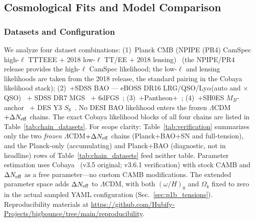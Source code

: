 \documentclass[aps,prd,twocolumn,superscriptaddress,showpacs,preprintnumbers,nofootinbib,longbibliography,floatfix]{revtex4-2}
\newcommand{\Neff}{N_{\rm eff}}
\begin{document}


\subsection{Cosmological Fits and Model Comparison}\label{sec:p1b_cosmo_fits}

\subsubsection{Datasets and Configuration}\label{sec:p1b_fullcomp}

We analyze four dataset combinations: (1)~Planck CMB (NPIPE (PR4) CamSpec high-$\ell$ TTTEEE + 2018 low-$\ell$ TT/EE + 2018 lensing)~\cite{Planck2018params}
(the NPIPE/PR4 release provides the high-$\ell$ CamSpec likelihood; the
low-$\ell$ and lensing likelihoods are taken from the 2018 release, the
standard pairing in the Cobaya likelihood stack);
(2)~+SDSS BAO --- eBOSS DR16 LRG/QSO/Ly$\alpha$(auto and
$\times$QSO)~\cite{eBOSS2021} + SDSS DR7 MGS~\cite{Ross2015MGS} +
6dFGS~\cite{Beutler20116dF}; (3)~+Pantheon+~\cite{Brout2022PantheonPlus}; (4)~+SH0ES
$M_B$-anchor~\cite{Riess2022} + DES Y3 $S_8$~\cite{DES2024}. No DESI BAO
likelihood enters the frozen $\Lambda$CDM$+\Delta\Neff$ chains. The exact
Cobaya likelihood blocks of all four chains are listed in
Table~\ref{tab:chain_datasets}. For scope
clarity: Table~\ref{tab:verification} summarizes only the two
\emph{frozen} $\Lambda$CDM$+\Delta\Neff$ chains (Planck+BAO+SN and
full-tension), and the Planck-only
(accumulating) and Planck+BAO (diagnostic, not in headline) rows of
Table~\ref{tab:chain_datasets} feed neither table. Parameter estimation
uses Cobaya~\cite{Cobaya2021} (v3.5 original; v3.6.1 verification) with
stock CAMB and $\Delta\Neff$ as a free parameter---no custom CAMB modifications.
The extended parameter space adds $\Delta\Neff$ to $\Lambda$CDM, with both
$(\omega/H)_0$ and $\Omega_k$ fixed to zero in the actual sampled YAML
configuration (Sec.~\ref{sec:p1b_tensions}). Reproducibility materials at
\url{https://github.com/Hubify-Projects/bigbounce/tree/main/reproducibility}.
\end{document}
